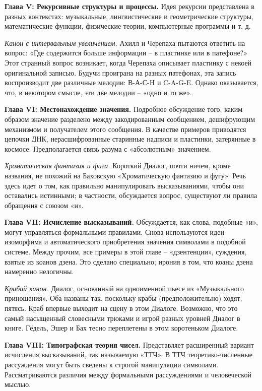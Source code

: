 \documentclass[../main.tex]{subfiles}
\begin{document}
\textbf{Глава V: Рекурсивные структуры и процессы.}
Идея рекурсии представлена в разных контекстах: музыкальные, лингвистические и геометрические структуры, математические функции, физические теории, компьютерные программы и т. д.

\emph{Канон с интервальным увеличением.}
Ахилл и Черепаха пытаются ответить на вопрос: «Где содержится больше информации \--- в пластинке или в патефоне?» Этот странный вопрос возникает, когда Черепаха описывает пластинку с некоей оригинальной записью. Будучи проиграна на разных патефонах, эта запись воспроизводит две различные мелодии: В-А-С-H и C-A-G-E. Однако оказывается, что, в некотором смысле, эти две мелодии \--- «одно и то же».

\textbf{Глава VI: Местонахождение значения.}
Подробное обсуждение того, каким образом значение разделено между закодированным сообщением, дешифрующим механизмом и получателем этого сообщения. В качестве примеров приводятся цепочки ДНК, нерасшифрованные старинные надписи и пластинки, затерянные в космосе. Предполагается связь разума с «абсолютным» значением.

\emph{Хроматическая фантазия и фига.}
Короткий Диалог, почти ничем, кроме названия, не похожий на Баховскую «Хроматическую фантазию и фугу». Речь здесь идет о том, как правильно манипулировать высказываниями, чтобы они оставались истинными; в частности, обсуждается вопрос, существуют ли правила обращения с союзом «и».

\textbf{Глава VII: Исчисление высказываний.}
Обсуждается, как слова, подобные «и», могут управляться формальными правилами. Снова используются идеи изоморфима и автоматического приобретения значения символами в подобной системе. Между прочим, все примеры в этой главе \--- «дзентенции», суждения, взятые из коанов дзена. Это сделано специально; ирония в том, что коаны дзена намеренно нелогичны.

\emph{Крабий канон.}
Диалог, основанный на одноименной пьесе из «Музыкального приношения». Оба названы так, поскольку крабы (предположительно) ходят, пятясь. Краб впервые выходит на сцену в этом Диалоге. Возможно, что это самый насыщенный словесными трюками и игрой разных уровней Диалог в книге. Гёдель, Эшер и Бах тесно переплетены в этом коротеньком Диалоге.

\textbf{Глава VIII: Типографская теория чисел.}
Представляет расширенный вариант исчисления высказываний, так называемую «ТТЧ». В ТТЧ теоретико-численные рассуждения могут быть сведены к строгой манипуляции символами. Рассматриваются различия между формальными рассуждениями и человеческой мыслью.
\end{document}
